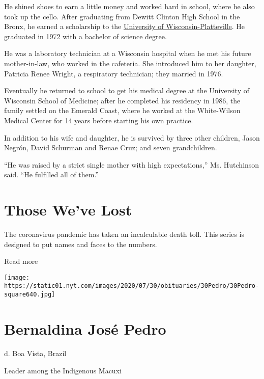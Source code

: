 He shined shoes to earn a little money and worked hard in school, where
he also took up the cello. After graduating from Dewitt Clinton High
School in the Bronx, he earned a scholarship to the
\href{https://www.uwplatt.edu/}{University of Wisconsin-Platteville}. He
graduated in 1972 with a bachelor of science degree.

He was a laboratory technician at a Wisconsin hospital when he met his
future mother-in-law, who worked in the cafeteria. She introduced him to
her daughter, Patricia Renee Wright, a respiratory technician; they
married in 1976.

Eventually he returned to school to get his medical degree at the
University of Wisconsin School of Medicine; after he completed his
residency in 1986, the family settled on the Emerald Coast, where he
worked at the White-Wilson Medical Center for 14 years before starting
his own practice.

In addition to his wife and daughter, he is survived by three other
children, Jason Negrón, David Schurman and Renae Cruz; and seven
grandchildren.

``He was raised by a strict single mother with high expectations,'' Ms.
Hutchinson said. ``He fulfilled all of them.''

\href{https://www.nytimes.com/interactive/2020/obituaries/people-died-coronavirus-obituaries.html?action=click\&pgtype=Article\&state=default\&region=BELOW_MAIN_CONTENT\&context=covid_obits_promo}{}

\hypertarget{those-weve-lost}{%
\section{Those We've Lost}\label{those-weve-lost}}

The coronavirus pandemic has taken an incalculable death toll. This
series is designed to put names and faces to the numbers.

Read more

\texttt{[image: https://static01.nyt.com/images/2020/07/30/obituaries/30Pedro/30Pedro-square640.jpg]}

\hypertarget{bernaldina-josuxe9-pedro}{%
\section{Bernaldina José Pedro}\label{bernaldina-josuxe9-pedro}}

d. Boa Vista, Brazil

Leader among the Indigenous Macuxi

